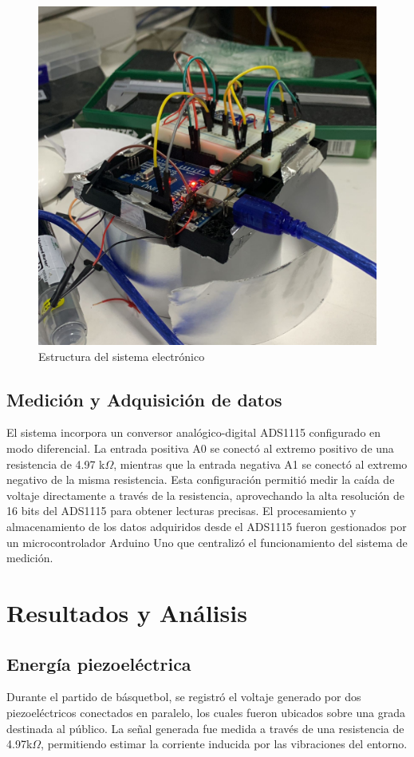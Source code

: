 \documentclass{article}
\begin{document}
\begin{figure}[H]
    \centering
    \includegraphics[width=0.5\linewidth]{sistema basquetbol.jpeg}
    \caption{Estructura del sistema electrónico}
    \label{fig:enter-label}
\end{figure}


\subsection{Medición y Adquisición de datos}
El sistema incorpora un conversor analógico-digital ADS1115 configurado en modo diferencial. La entrada positiva A0 se conectó al extremo positivo de una resistencia de 4.97 k$\Omega$, mientras que la entrada negativa A1 se conectó al extremo negativo de la misma resistencia. Esta configuración permitió medir la caída de voltaje directamente a través de la resistencia, aprovechando la alta resolución de 16 bits del ADS1115 para obtener lecturas precisas. El procesamiento y almacenamiento de los datos adquiridos desde el ADS1115 fueron gestionados por un microcontrolador Arduino Uno que centralizó el funcionamiento del sistema de medición. \cite{CodigoArduino}

\section{Resultados y Análisis}
\subsection{Energía piezoeléctrica}
Durante el partido de básquetbol, se registró el voltaje generado por dos piezoeléctricos conectados en paralelo, los cuales fueron ubicados sobre una grada destinada al público. La señal generada fue medida a través de una resistencia de 4.97k$\Omega$, permitiendo estimar la corriente inducida por las vibraciones del entorno.
\end{document}
